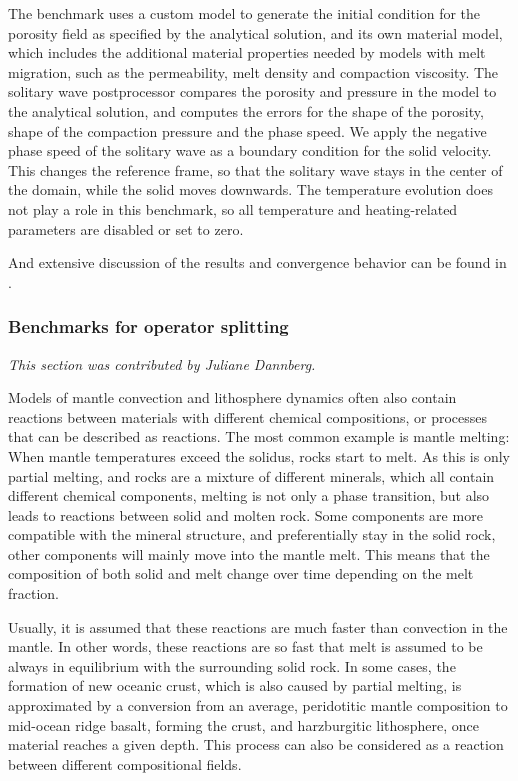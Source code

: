 \documentclass{article}
\begin{document}
The benchmark uses a custom model to generate the initial condition for the porosity field as specified by the analytical solution, and its own material model, which includes the additional material properties needed by models with melt migration, such as the permeability, melt density and compaction viscosity. The solitary wave postprocessor compares the porosity and pressure in the model to the analytical solution, and computes the errors for the shape of the porosity, shape of the compaction pressure and the phase speed.
We apply the negative phase speed of the solitary wave as a boundary condition for the solid velocity. This changes the reference frame, so that the solitary wave stays in the center of the domain, while the solid moves downwards. The temperature evolution does not play a role in this benchmark, so all temperature and heating-related parameters are disabled or set to zero.

And extensive discussion of the results and convergence behavior can be found in \cite{dannberg_melt}.

\subsubsection{Benchmarks for operator splitting}
\label{sec:benchmark-operator_splitting}

\textit{This section was contributed by Juliane Dannberg.}

Models of mantle convection and lithosphere dynamics often also contain reactions between materials with different chemical compositions, or processes that can be described as reactions.
The most common example is mantle melting: When mantle temperatures exceed the solidus, rocks start to melt. As this is only partial melting, and rocks are a mixture of different minerals, which all contain different chemical components, melting is not only a phase transition, but also leads to reactions between solid and molten rock. Some components are more compatible with the mineral structure, and preferentially stay in the solid rock, other components will mainly move into the mantle melt. This means that the composition of both solid and melt change over time depending on the melt fraction.

Usually, it is assumed that these reactions are much faster than convection in the mantle. In other words, these reactions are so fast that melt is assumed to be always in equilibrium with the surrounding solid rock. In some cases, the formation of new oceanic crust, which is also caused by partial melting, is approximated by a conversion from an average, peridotitic mantle composition to mid-ocean ridge basalt, forming the crust, and harzburgitic lithosphere, once material reaches a given depth. This process can also be considered as a reaction between different compositional fields.
\end{document}
